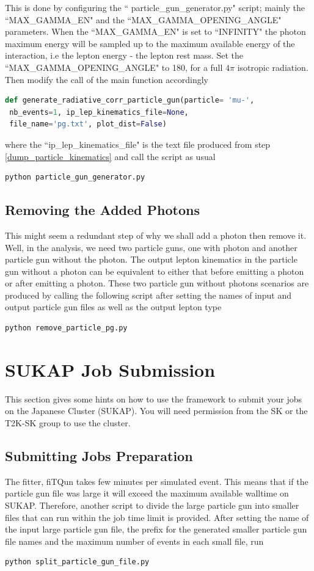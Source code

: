 \documentclass[12pt]{article}
\begin{document}
 This is done by configuring the `` particle\_gun\_generator.py" script; mainly the ``MAX\_GAMMA\_EN" and the ``MAX\_GAMMA\_OPENING\_ANGLE" parameters. When the ``MAX\_GAMMA\_EN" is set to ``INFINITY" the photon maximum energy will be sampled up to the maximum available energy of the interaction, i.e the lepton energy - the lepton rest mass. Set the ``MAX\_GAMMA\_OPENING\_ANGLE" to 180, for a full $4\pi$ isotropic radiation.
Then modify the call of the main function accordingly
\begin{lstlisting}[language=Python, caption=Adding Photons ]
 def generate_radiative_corr_particle_gun(particle= 'mu-',
 nb_events=1, ip_lep_kinematics_file=None,
 file_name='pg.txt', plot_dist=False)							
\end{lstlisting}
where the ``ip\_lep\_kinematics\_file" is the text file produced from step \ref{dump_particle_kinematics} and call the script as usual
\begin{lstlisting}[language=Python, caption=Adding Photons ]
python particle_gun_generator.py							
\end{lstlisting}
\subsection{Removing the Added Photons}
This might seem a redundant step of why we shall add a photon then remove it. Well, in the analysis, we need two particle guns, one with photon and another particle gun without the photon. The output lepton kinematics in the particle gun without a photon can be equivalent to either that before emitting a photon or after emitting a photon. These two particle gun without photons scenarios are produced by calling the following script after setting the names of input and output particle gun files as well as the output lepton type 
\begin{lstlisting}[language=Python, caption=Removing Photons ]
python remove_particle_pg.py						
\end{lstlisting}
\section{SUKAP Job Submission}
This section gives some hints on how to use the framework to submit your jobs on the Japanese Cluster (SUKAP). You will need permission from the SK or the T2K-SK group to use the cluster.   
\subsection{Submitting Jobs Preparation}
The fitter, fiTQun takes few minutes per simulated event. This means that if the particle gun file was large it will exceed the maximum available walltime on SUKAP. 
Therefore, another script to divide the large particle gun into smaller files that can run within the job time limit is provided. After setting the name of the input large particle gun file, the prefix for the generated smaller particle gun file names and the maximum number of events in each small file, run  
\begin{lstlisting}[language=Python, caption=Splitting Particle Gun]
python split_particle_gun_file.py						
\end{lstlisting}
\end{document}
